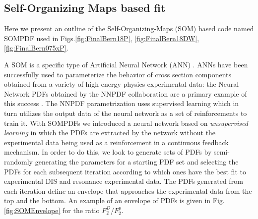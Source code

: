 \documentclass[
twocolumn,
aps,prd,
nofootinbib,
superscriptaddress,
showpacs,ligh
tightenlines, 
]{revtex4}
\begin{document}
\subsection{Self-Organizing Maps based fit}
Here we present an outline of the Self-Organizing-Maps (SOM) based code named SOMPDF \cite{Askanazi:2014gxa,Honkanen:2008mb} used in Figs.\ref{fig:FinalBern18P}, \ref{fig:FinalBern18DW}, \ref{fig:FinalBern075xP}. 

A SOM is a specific type of Artificial Neural Network (ANN) \cite{Kohonen}. 
ANNs have been successfully used to parameterize the behavior of cross section components obtained from a variety of high energy physics experimental data:  the Neural Network PDFs obtained by the NNPDF collaboration are a primary example of this success \cite{Forte:2013wc}.  The NNPDF parametrization uses supervised learning which in turn utilizes the output data of the neural network as a set of reinforcements to train it.  With SOMPDFs we introduced a neural network based on {\it unsupervised learning} in which the PDFs are extracted by the network without the experimental data being used as a reinforcement in a continuous feedback mechanism.  In order to do this, we look to generate sets of PDFs by semi-randomly generating the parameters for a starting PDF set and selecting the PDFs for each subsequent iteration according to which ones have the best fit to experimental DIS and resonance experimental data. The PDFs generated from each iteration define an envelope that approaches the experimental data from the top and the bottom. An example of an envelope of PDFs is given in Fig.\ref{fig:SOMEnvelope} for the ratio $F_2^D/F_2^p$.  
\end{document}
